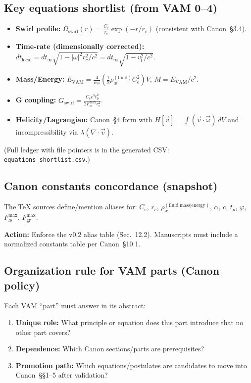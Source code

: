 \documentclass[11pt]{article}
\begin{document}
    \subsection{Key equations shortlist (from VAM 0--4)}
    \begin{itemize}
        \item \textbf{Swirl profile:} $\Omega_{\text{swirl}}(r) = \frac{C_e}{r_c} \exp(-r/r_c)$ (consistent with Canon~\S3.4).
        \item \textbf{Time-rate (dimensionally corrected):} $dt_{\text{local}} = dt_{\infty} \sqrt{1 - |\omega|^2 r_c^2 / c^2} = dt_{\infty} \sqrt{1 - v_t^2/c^2}$.
        \item \textbf{Mass/Energy:} $E_{\text{VAM}} = \frac{4}{\alpha\varphi} \left(\frac{1}{2} \rho_{\text{\ae}}^{(\text{fluid})} C_e^2\right) V$, $M = E_{\text{VAM}}/c^2$.
        \item \textbf{G coupling:} $G_{\text{swirl}} = \frac{C_e c^5 t_p^2}{2 F_{\text{\ae}}^{\max} r_c^2}$.
        \item \textbf{Helicity/Lagrangian:} Canon~\S4 form with $H[\vec{v}] = \int (\vec{v} \cdot \vec{\omega})\,dV$ and incompressibility via $\lambda (\nabla\cdot\vec{v})$.
    \end{itemize}
    (Full ledger with file pointers is in the generated CSV: \texttt{equations\_shortlist.csv}.)

    \subsection{Canon constants concordance (snapshot)}
    The TeX sources define/mention aliases for: $C_e$, $r_c$, $\rho_{\text{\ae}}^{(\text{fluid|mass|energy})}$, $\alpha$, $c$, $t_p$, $\varphi$, $F_{\text{\ae}}^{\max}$, $F_{\text{gr}}^{\max}$.

    \textbf{Action:} Enforce the v0.2 alias table (Sec.~12.2). Manuscripts must include a normalized constants table per Canon~\S10.1.

    \subsection{Organization rule for VAM parts (Canon policy)}
    Each VAM ``part'' must answer in its abstract:
    \begin{enumerate}
        \item \textbf{Unique role:} What principle or equation does this part introduce that no other part covers?
        \item \textbf{Dependence:} Which Canon sections/parts are prerequisites?
        \item \textbf{Promotion path:} Which equations/postulates are candidates to move into Canon~\S\S1--5 after validation?
    \end{enumerate}
\end{document}
